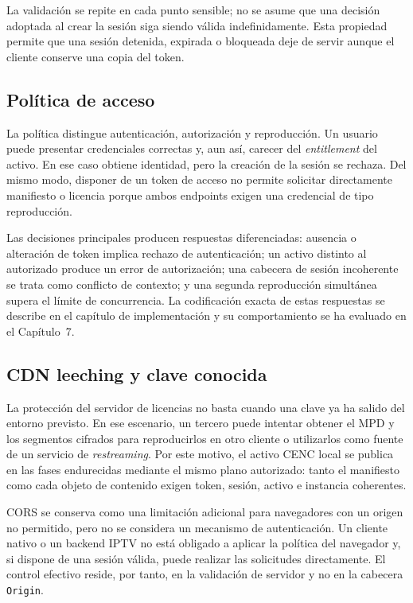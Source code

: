 La validación se repite en cada punto sensible; no se asume que una decisión adoptada al crear la sesión siga siendo válida indefinidamente. Esta propiedad permite que una sesión detenida, expirada o bloqueada deje de servir aunque el cliente conserve una copia del token.

\subsection{Política de acceso}

La política distingue autenticación, autorización y reproducción. Un usuario puede presentar credenciales correctas y, aun así, carecer del \textit{entitlement} del activo. En ese caso obtiene identidad, pero la creación de la sesión se rechaza. Del mismo modo, disponer de un token de acceso no permite solicitar directamente manifiesto o licencia porque ambos endpoints exigen una credencial de tipo reproducción.

Las decisiones principales producen respuestas diferenciadas: ausencia o alteración de token implica rechazo de autenticación; un activo distinto al autorizado produce un error de autorización; una cabecera de sesión incoherente se trata como conflicto de contexto; y una segunda reproducción simultánea supera el límite de concurrencia. La codificación exacta de estas respuestas se describe en el capítulo de implementación y su comportamiento se ha evaluado en el Capítulo~7.

\subsection{CDN leeching y clave conocida}

La protección del servidor de licencias no basta cuando una clave ya ha salido del entorno previsto. En ese escenario, un tercero puede intentar obtener el MPD y los segmentos cifrados para reproducirlos en otro cliente o utilizarlos como fuente de un servicio de \textit{restreaming}. Por este motivo, el activo CENC local se publica en las fases endurecidas mediante el mismo plano autorizado: tanto el manifiesto como cada objeto de contenido exigen token, sesión, activo e instancia coherentes.

CORS se conserva como una limitación adicional para navegadores con un origen no permitido, pero no se considera un mecanismo de autenticación. Un cliente nativo o un backend IPTV no está obligado a aplicar la política del navegador y, si dispone de una sesión válida, puede realizar las solicitudes directamente. El control efectivo reside, por tanto, en la validación de servidor y no en la cabecera \nolinkurl{Origin}.

